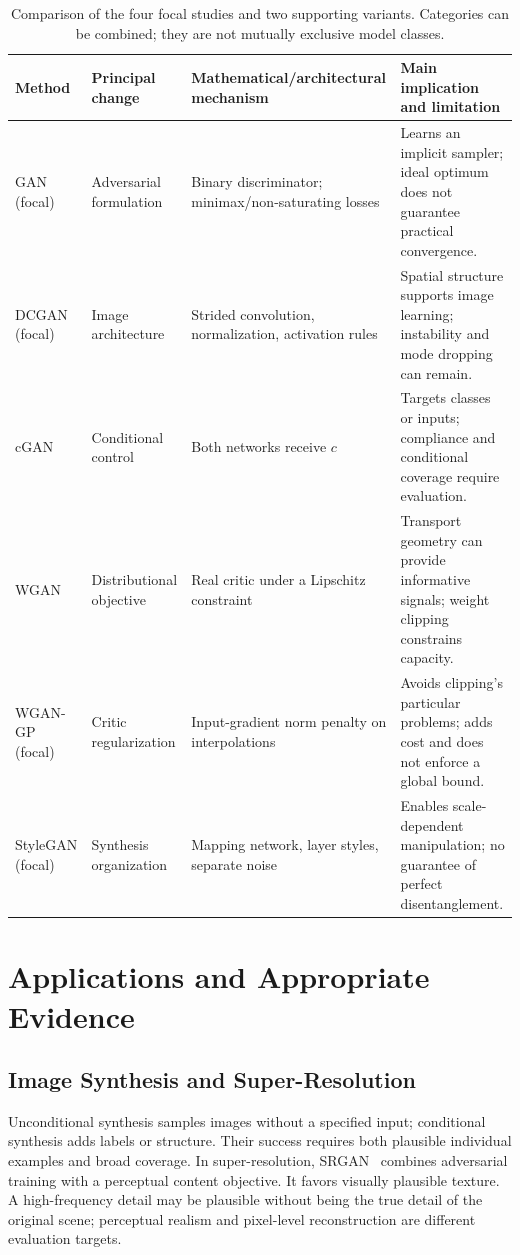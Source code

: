 \documentclass[conference]{IEEEtran}
\begin{document}
\begin{table}[t]\caption{Comparison of the four focal studies and two supporting variants. Categories can be combined; they are not mutually exclusive model classes.}\centering\small
\begin{tabular}{p{1.5cm}p{3.0cm}p{4.35cm}p{5.9cm}}\toprule
Method & Principal change & Mathematical/architectural mechanism & Main implication and limitation\\\midrule
GAN (focal) & Adversarial formulation & Binary discriminator; minimax/non-saturating losses & Learns an implicit sampler; ideal optimum does not guarantee practical convergence.\\
DCGAN (focal) & Image architecture & Strided convolution, normalization, activation rules & Spatial structure supports image learning; instability and mode dropping can remain.\\
cGAN & Conditional control & Both networks receive $c$ & Targets classes or inputs; compliance and conditional coverage require evaluation.\\
WGAN & Distributional objective & Real critic under a Lipschitz constraint & Transport geometry can provide informative signals; weight clipping constrains capacity.\\
WGAN-GP (focal) & Critic regularization & Input-gradient norm penalty on interpolations & Avoids clipping's particular problems; adds cost and does not enforce a global bound.\\
StyleGAN (focal) & Synthesis organization & Mapping network, layer styles, separate noise & Enables scale-dependent manipulation; no guarantee of perfect disentanglement.\\\bottomrule
\end{tabular}\label{tab:compare}\end{table}

\section{Applications and Appropriate Evidence}
\subsection{Image Synthesis and Super-Resolution}
Unconditional synthesis samples images without a specified input; conditional synthesis adds labels or structure. Their success requires both plausible individual examples and broad coverage. In super-resolution, SRGAN~\cite{sr} combines adversarial training with a perceptual content objective. It favors visually plausible texture. A high-frequency detail may be plausible without being the true detail of the original scene; perceptual realism and pixel-level reconstruction are different evaluation targets.
\end{document}

